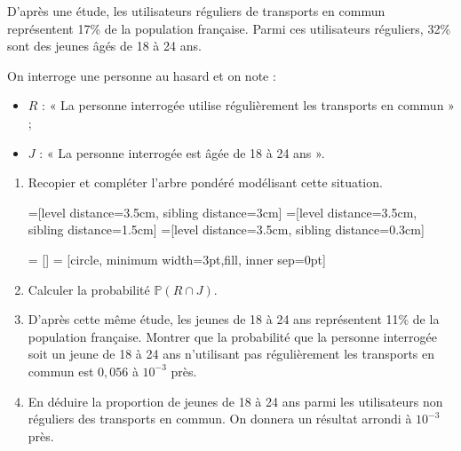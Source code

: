\documentclass[11pt,fleqn, openany]{book} %
\begin{document}
\begin{exercise}[topic=prob01, subtitle={(Centres étrangers 2021)}]

D'après une étude, les utilisateurs réguliers de transports en commun représentent 17\% de la population française. Parmi ces utilisateurs réguliers, 32\% sont des jeunes âgés  de 18 à 24 ans.

On interroge une personne au hasard et on note :
\begin{itemize}
\item $R$ : « La personne interrogée utilise régulièrement les transports en commun » ;
\item $J$ : « La personne interrogée est âgée de 18 à 24 ans ».
\end{itemize}

\begin{enumerate}
\item Recopier et compléter l'arbre pondéré modélisant cette situation.


=[level distance=3.5cm, sibling distance=3cm]
=[level distance=3.5cm, sibling distance=1.5cm]
=[level distance=3.5cm, sibling distance=0.3cm]

 = []
 = [circle, minimum width=3pt,fill, inner sep=0pt]


\begin{center}
\end{center}

\item Calculer la probabilité $\mathbb{P}(R \cap J)$.
\item D'après cette même étude, les jeunes de 18 à 24 ans représentent 11\% de la
population française. Montrer que la probabilité que la personne interrogée soit un jeune de 18 à 24 ans n'utilisant pas régulièrement les transports en commun est $0,056$ à $10^{-3}$ près.
\item En déduire la proportion de jeunes de 18 à 24 ans parmi les utilisateurs non
réguliers des transports en commun. On donnera un résultat arrondi à $10^{-3}$ près.

\newpage
\end{enumerate}\end{exercise}
\end{document}
